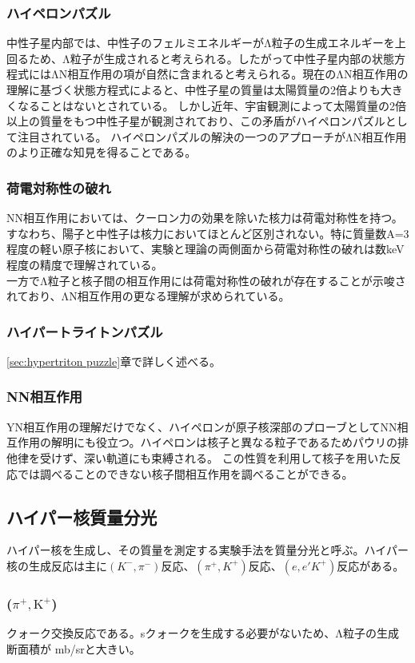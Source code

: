 \documentclass[a4paper,11pt,uplatex]{jsbook}
\begin{document}
\subsubsection{ハイペロンパズル}
中性子星内部では、中性子のフェルミエネルギーがΛ粒子の生成エネルギーを上回るため、Λ粒子が生成されると考えられる。したがって中性子星内部の状態方程式にはΛN相互作用の項が自然に含まれると考えられる。現在のΛN相互作用の理解に基づく状態方程式によると、中性子星の質量は太陽質量の2倍よりも大きくなることはないとされている。
しかし近年、宇宙観測によって太陽質量の2倍以上の質量をもつ中性子星が観測されており、この矛盾がハイペロンパズルとして注目されている。
ハイペロンパズルの解決の一つのアプローチがΛN相互作用のより正確な知見を得ることである。
\subsubsection{荷電対称性の破れ}
NN相互作用においては、クーロン力の効果を除いた核力は荷電対称性を持つ。すなわち、陽子と中性子は核力においてほとんど区別されない。特に質量数A=3程度の軽い原子核において、実験と理論の両側面から荷電対称性の破れは数keV程度の精度で理解されている。\\
一方でΛ粒子と核子間の相互作用には荷電対称性の破れが存在することが示唆されており、ΛN相互作用の更なる理解が求められている。
\subsubsection{ハイパートライトンパズル}
\ref{sec:hypertriton puzzle}章で詳しく述べる。
\subsubsection{NN相互作用}

YN相互作用の理解だけでなく、ハイペロンが原子核深部のプローブとしてNN相互作用の解明にも役立つ。ハイペロンは核子と異なる粒子であるためパウリの排他律を受けず、深い軌道にも束縛される。
この性質を利用して核子を用いた反応では調べることのできない核子間相互作用を調べることができる。
\subsection{ハイパー核質量分光}
ハイパー核を生成し、その質量を測定する実験手法を質量分光と呼ぶ。ハイパー核の生成反応は主に$(K^-, \pi^-)$反応、$(\pi^+, K^+)$反応、$(e,e'K^+)$反応がある。
\subsubsection{($\pi^+, \text{K}^+$)}
クォーク交換反応である。sクォークを生成する必要がないため、Λ粒子の生成断面積が mb/srと大きい。
\end{document}
